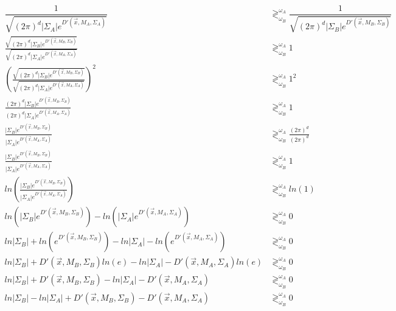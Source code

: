 \documentclass{article}
\begin{document}
\begin{align*}
  \dfrac{1}{\sqrt{(2\pi)^d |\Sigma_A| e^{D'(\vec{x},M_A,\Sigma_A)}}} 
  &\gtrless^{\omega_A}_{\omega_B}
  \dfrac{1}{\sqrt{(2\pi)^d |\Sigma_B| e^{D'(\vec{x},M_B,\Sigma_B)}}} \\
  \frac{\sqrt{(2\pi)^d |\Sigma_B|
      e^{D'(\vec{x},M_B,\Sigma_B)}}}{\sqrt{(2\pi)^d |\Sigma_A|
      e^{D'(\vec{x},M_A,\Sigma_A)}}}
  &\gtrless^{\omega_A}_{\omega_B}
  1 \\
  \left(
  \frac{\sqrt{(2\pi)^d |\Sigma_B|
      e^{D'(\vec{x},M_B,\Sigma_B)}}}{\sqrt{(2\pi)^d |\Sigma_A|
      e^{D'(\vec{x},M_A,\Sigma_A)}}}
  \right)^2
  &\gtrless^{\omega_A}_{\omega_B}
  1^2 \\
  \frac{(2\pi)^d |\Sigma_B|
      e^{D'(\vec{x},M_B,\Sigma_B)}}{(2\pi)^d |\Sigma_A|
      e^{D'(\vec{x},M_A,\Sigma_A)}}
  &\gtrless^{\omega_A}_{\omega_B}
  1 \\
  \frac{|\Sigma_B|
      e^{D'(\vec{x},M_B,\Sigma_B)}}{|\Sigma_A|
      e^{D'(\vec{x},M_A,\Sigma_A)}}
  &\gtrless^{\omega_A}_{\omega_B}
  \frac{(2\pi)^d}{(2\pi)^d} \\
  \frac{|\Sigma_B|
      e^{D'(\vec{x},M_B,\Sigma_B)}}{|\Sigma_A|
      e^{D'(\vec{x},M_A,\Sigma_A)}}
  &\gtrless^{\omega_A}_{\omega_B}
  1 \\
  ln \left(
  \frac{|\Sigma_B|
      e^{D'(\vec{x},M_B,\Sigma_B)}}{|\Sigma_A|
      e^{D'(\vec{x},M_A,\Sigma_A)}}
  \right)
  &\gtrless^{\omega_A}_{\omega_B}
  ln(1) \\
  ln(|\Sigma_B|e^{D'(\vec{x},M_B,\Sigma_B)}) -
  ln(|\Sigma_A|e^{D'(\vec{x},M_A,\Sigma_A)})
  &\gtrless^{\omega_A}_{\omega_B}
  0 \\
  ln|\Sigma_B| + ln(e^{D'(\vec{x},M_B,\Sigma_B)}) -
  ln|\Sigma_A| - ln(e^{D'(\vec{x},M_A,\Sigma_A)})
  &\gtrless^{\omega_A}_{\omega_B}
  0 \\
  ln|\Sigma_B| + D'(\vec{x},M_B,\Sigma_B)ln(e) -
  ln|\Sigma_A| - D'(\vec{x},M_A,\Sigma_A)ln(e)
  &\gtrless^{\omega_A}_{\omega_B}
  0 \\
  ln|\Sigma_B| + D'(\vec{x},M_B,\Sigma_B) -
  ln|\Sigma_A| - D'(\vec{x},M_A,\Sigma_A)
  &\gtrless^{\omega_A}_{\omega_B}
  0 \\
  ln|\Sigma_B| - ln|\Sigma_A| +
  D'(\vec{x},M_B,\Sigma_B) - D'(\vec{x},M_A,\Sigma_A)
  &\gtrless^{\omega_A}_{\omega_B}
  0 \\
\end{align*}


\end{document}

